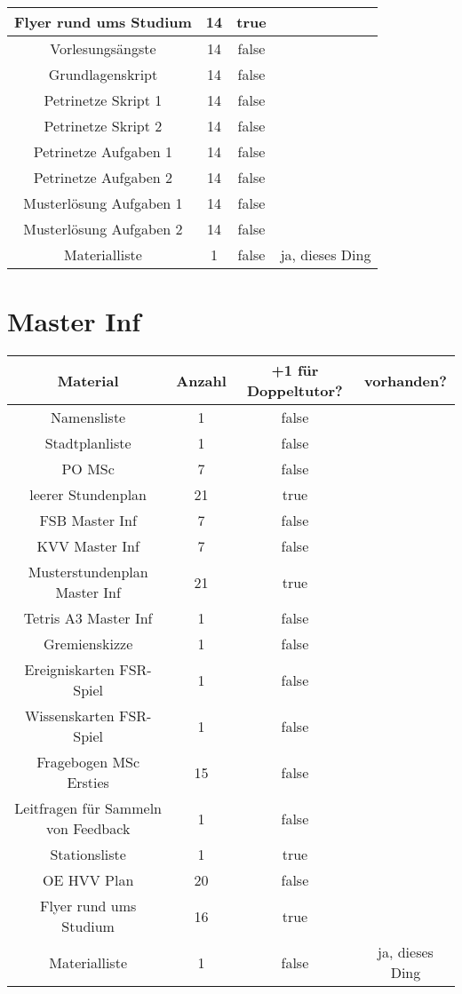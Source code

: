 \documentclass[10pt,a4paper,oneside,ngerman,numbers=noenddot]{scrartcl}
\begin{document}
\begin{tabular}{c|c|c|c}
		\hline
		Flyer rund ums Studium & 14 & true & \\
		\hline
		Vorlesungsängste & 14 & false & \\
		\hline
		Grundlagenskript & 14 & false & \\
		\hline
		Petrinetze Skript 1 & 14 & false & \\
		\hline
		Petrinetze Skript 2 & 14 & false & \\
		\hline
		Petrinetze Aufgaben 1 & 14 & false & \\
		\hline
		Petrinetze Aufgaben 2 & 14 & false & \\
		\hline
		Musterlösung Aufgaben 1 & 14 & false & \\
		\hline
		Musterlösung Aufgaben 2 & 14 & false & \\
		\hline
		Materialliste & 1 & false & ja, dieses Ding \\
	\end{tabular}

\section{Master Inf}

	\begin{tabular}{c|c|c|c}
		\textbf{Material} & \textbf{Anzahl} & \textbf{+1 für Doppeltutor?} & \textbf{vorhanden?} \\
		\hline
		Namensliste & 1 & false & \\
		\hline
		Stadtplanliste & 1 & false & \\
		\hline
		PO MSc & 7 & false & \\
		\hline
		leerer Stundenplan & 21 & true & \\
		\hline
		FSB Master Inf & 7 & false & \\
		\hline
		KVV Master Inf & 7 & false & \\
		\hline
		Musterstundenplan Master Inf & 21 & true & \\
		\hline
		Tetris A3 Master Inf & 1 & false & \\
		\hline
		Gremienskizze & 1 & false & \\
		\hline
		Ereigniskarten FSR-Spiel & 1 & false & \\
		\hline
		Wissenskarten FSR-Spiel & 1 & false & \\
		\hline
		Fragebogen MSc Ersties & 15 & false & \\
		\hline
		Leitfragen für Sammeln von Feedback & 1 & false & \\
		\hline
		Stationsliste & 1 & true & \\
		\hline
		OE HVV Plan & 20 & false & \\
		\hline
		Flyer rund ums Studium & 16 & true & \\
		\hline
		Materialliste & 1 & false & ja, dieses Ding \\
	\end{tabular}
\end{document}
